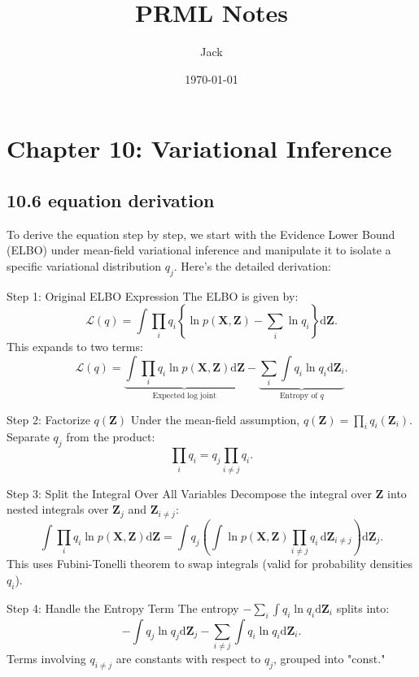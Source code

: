 \documentclass{article}
\title{PRML Notes}
\author{Jack}
\date{\today}
\begin{document}
\maketitle

\section{Chapter 10: Variational Inference}
\subsection{10.6 equation derivation}

To derive the equation step by step, we start with the Evidence Lower Bound (ELBO) under mean-field variational inference and manipulate it to isolate a specific variational distribution \( q_j \). Here's the detailed derivation:

\hrulefill

 Step 1: Original ELBO Expression
The ELBO is given by:
\[
\mathcal{L}(q) = \int \prod_i q_i \left\{ \ln p(\mathbf{X}, \mathbf{Z}) - \sum_i \ln q_i \right\} \mathrm{d}\mathbf{Z}.
\]
This expands to two terms:
\[
\mathcal{L}(q) = \underbrace{\int \prod_i q_i \ln p(\mathbf{X}, \mathbf{Z}) \mathrm{d}\mathbf{Z}}_{\text{Expected log joint}} - \underbrace{\sum_i \int q_i \ln q_i \mathrm{d}\mathbf{Z}_i}_{\text{Entropy of } q}.
\]

\hrulefill

 Step 2: Factorize \( q(\mathbf{Z}) \)
Under the mean-field assumption, \( q(\mathbf{Z}) = \prod_i q_i(\mathbf{Z}_i) \). Separate \( q_j \) from the product:
\[
\prod_i q_i = q_j \prod_{i \neq j} q_i.
\]

\hrulefill

 Step 3: Split the Integral Over All Variables
Decompose the integral over \( \mathbf{Z} \) into nested integrals over \( \mathbf{Z}_j \) and \( \mathbf{Z}_{i \neq j} \):
\[
\int \prod_i q_i \ln p(\mathbf{X}, \mathbf{Z}) \mathrm{d}\mathbf{Z} = \int q_j \left( \int \ln p(\mathbf{X}, \mathbf{Z}) \prod_{i \neq j} q_i \, \mathrm{d}\mathbf{Z}_{i \neq j} \right) \mathrm{d}\mathbf{Z}_j.
\]
This uses Fubini-Tonelli theorem to swap integrals (valid for probability densities \( q_i \)).

\hrulefill

 Step 4: Handle the Entropy Term
The entropy \( -\sum_i \int q_i \ln q_i \mathrm{d}\mathbf{Z}_i \) splits into:
\[
-\int q_j \ln q_j \mathrm{d}\mathbf{Z}_j - \sum_{i \neq j} \int q_i \ln q_i \mathrm{d}\mathbf{Z}_i.
\]
Terms involving \( q_{i \neq j} \) are constants with respect to \( q_j \), grouped into "const."
\end{document}
